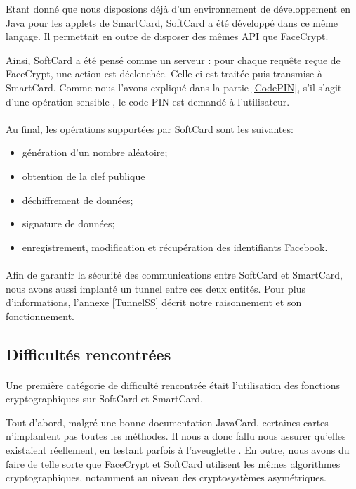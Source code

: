 \documentclass[a4paper,11pt,french]{article}
\begin{document}
Etant donné que nous disposions déjà d'un environnement de développement en Java
pour les applets de SmartCard, SoftCard a été développé dans ce même langage. Il
permettait en outre de disposer des mêmes API que FaceCrypt.

Ainsi, SoftCard a été pensé comme un serveur : pour chaque requête reçue de 
FaceCrypt, une action est déclenchée. Celle-ci est traitée puis transmise à
SmartCard. Comme nous l'avons expliqué dans la partie \ref{CodePIN}, s'il s'agit
d'une opération \og sensible \fg, le code PIN est demandé à l'utilisateur.

\paragraph{}
Au final, les opérations supportées par SoftCard sont les suivantes:  
\begin{itemize}
    \item génération d'un nombre aléatoire;
    \item obtention de la clef publique
    \item déchiffrement de données;
    \item signature de données;
    \item enregistrement, modification et récupération des identifiants Facebook.
\end{itemize}

\paragraph{}
Afin de garantir la sécurité des communications entre SoftCard et SmartCard,
nous avons aussi implanté un tunnel entre ces deux entités. Pour plus 
d'informations, l'annexe \ref{TunnelSS} décrit notre raisonnement et son
fonctionnement.

\subsection{Difficultés rencontrées}
\paragraph{}
Une première catégorie de difficulté rencontrée était l'utilisation des fonctions
cryptographiques sur SoftCard et SmartCard.

Tout d'abord, malgré une bonne documentation JavaCard, certaines cartes 
n'implantent pas toutes les méthodes. Il nous a donc fallu nous assurer 
qu'elles existaient réellement, en testant parfois \og à l'aveuglette 
\fg{}. En outre, nous avons du faire de telle sorte que FaceCrypt et SoftCard 
utilisent les mêmes algorithmes cryptographiques, notamment au niveau des 
cryptosystèmes asymétriques.
\end{document}
